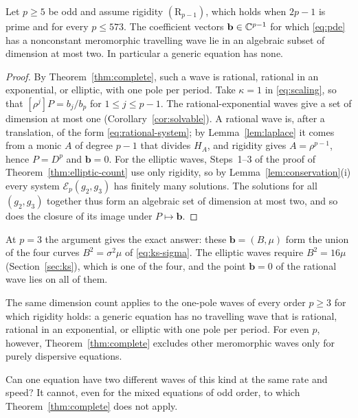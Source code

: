 \begin{corollary}\label{cor:generic}
Let \(p\ge5\) be odd and assume rigidity \((\mathrm R_{p-1})\), which
holds when \(2p-1\) is prime and for every \(p\le573\). The coefficient
vectors \(\mathbf b\in\mathbb C^{p-1}\) for which \eqref{eq:pde} has a
nonconstant meromorphic travelling wave lie in an algebraic subset of
dimension at most two. In particular a generic equation has none.
\end{corollary}

\begin{proof}
By Theorem~\ref{thm:complete}, such a wave is rational, rational in an
exponential, or elliptic, with one pole per period. Take \(\kappa=1\) in
\eqref{eq:scaling}, so that \([\rho^j]P=b_j/b_p\) for \(1\le j\le p-1\).
The rational-exponential waves give a set of dimension at most one
(Corollary~\ref{cor:solvable}). A rational wave is, after a translation,
of the form \eqref{eq:rational-system}; by Lemma~\ref{lem:laplace} it
comes from a monic \(A\) of degree \(p-1\) that divides \(H_A\), and
rigidity gives \(A=\rho^{p-1}\), hence \(P=D^p\) and \(\mathbf b=0\).
For the elliptic waves, Steps~1--3 of the proof of
Theorem~\ref{thm:elliptic-count} use only rigidity, so by
Lemma~\ref{lem:conservation}(i) every system \(\mathcal E_p(g_2,g_3)\)
has finitely many solutions. The solutions for all \((g_2,g_3)\)
together thus form an algebraic set of dimension at most two, and so
does the closure of its image under \(P\mapsto\mathbf b\).
\end{proof}

\begin{remark}\label{rem:ks-curves}
At \(p=3\) the argument gives the exact answer: these
\(\mathbf b=(B,\mu)\) form the union of the four curves
\(B^2=\sigma^2\mu\) of \eqref{eq:ks-sigma}. The elliptic waves require
\(B^2=16\mu\) (Section~\ref{sec:ks}), which is one of the four, and the
point \(\mathbf b=0\) of the rational wave lies on all of them.
\end{remark}

The same dimension count applies to the one-pole waves of every order
\(p\ge3\) for which rigidity holds: a generic equation has no travelling
wave that is rational, rational in an exponential, or elliptic with one
pole per period. For even \(p\), however, Theorem~\ref{thm:complete}
excludes other meromorphic waves only for purely dispersive equations.

Can one equation have two different waves of this kind at the same rate
and speed? It cannot, even for the mixed equations of odd order, to
which Theorem~\ref{thm:complete} does not apply.

